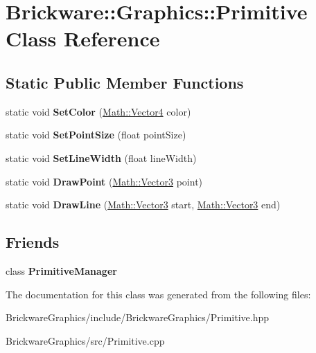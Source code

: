 \hypertarget{classBrickware_1_1Graphics_1_1Primitive}{}\section{Brickware\+:\+:Graphics\+:\+:Primitive Class Reference}
\label{classBrickware_1_1Graphics_1_1Primitive}
\subsection*{Static Public Member Functions}
\begin{DoxyCompactItemize}
\item 
\hypertarget{classBrickware_1_1Graphics_1_1Primitive_a6b137ca0479714ab2423011702309bc7}{}static void {\bfseries Set\+Color} (\hyperlink{classBrickware_1_1Math_1_1Vector4}{Math\+::\+Vector4} color)\label{classBrickware_1_1Graphics_1_1Primitive_a6b137ca0479714ab2423011702309bc7}

\item 
\hypertarget{classBrickware_1_1Graphics_1_1Primitive_ac03664d78031aa1216b1c8804ee644db}{}static void {\bfseries Set\+Point\+Size} (float point\+Size)\label{classBrickware_1_1Graphics_1_1Primitive_ac03664d78031aa1216b1c8804ee644db}

\item 
\hypertarget{classBrickware_1_1Graphics_1_1Primitive_a3dae1fb24550cf99a2cfa243b0299d8c}{}static void {\bfseries Set\+Line\+Width} (float line\+Width)\label{classBrickware_1_1Graphics_1_1Primitive_a3dae1fb24550cf99a2cfa243b0299d8c}

\item 
\hypertarget{classBrickware_1_1Graphics_1_1Primitive_a66b1ab485dbbc3031ae8d1c8e36339b4}{}static void {\bfseries Draw\+Point} (\hyperlink{classBrickware_1_1Math_1_1Vector3}{Math\+::\+Vector3} point)\label{classBrickware_1_1Graphics_1_1Primitive_a66b1ab485dbbc3031ae8d1c8e36339b4}

\item 
\hypertarget{classBrickware_1_1Graphics_1_1Primitive_a43fe1335bc377d531998d7d4b96f7994}{}static void {\bfseries Draw\+Line} (\hyperlink{classBrickware_1_1Math_1_1Vector3}{Math\+::\+Vector3} start, \hyperlink{classBrickware_1_1Math_1_1Vector3}{Math\+::\+Vector3} end)\label{classBrickware_1_1Graphics_1_1Primitive_a43fe1335bc377d531998d7d4b96f7994}

\end{DoxyCompactItemize}
\subsection*{Friends}
\begin{DoxyCompactItemize}
\item 
\hypertarget{classBrickware_1_1Graphics_1_1Primitive_a6046fab128ff98a4d4a4ccd3083fcc1a}{}class {\bfseries Primitive\+Manager}\label{classBrickware_1_1Graphics_1_1Primitive_a6046fab128ff98a4d4a4ccd3083fcc1a}

\end{DoxyCompactItemize}


The documentation for this class was generated from the following files\+:\begin{DoxyCompactItemize}
\item 
Brickware\+Graphics/include/\+Brickware\+Graphics/Primitive.\+hpp\item 
Brickware\+Graphics/src/Primitive.\+cpp\end{DoxyCompactItemize}
